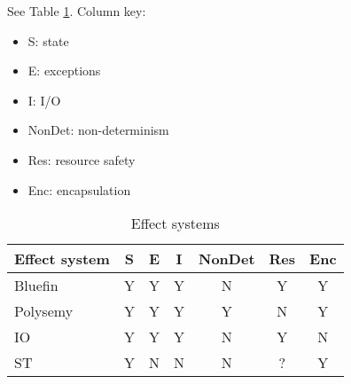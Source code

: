 \documentclass[sigplan,screen]{acmart}
\begin{document}
See Table \ref{tab:comparison}.  Column key:

\begin{itemize}
\item S: state
\item E: exceptions
\item I: I/O
\item NonDet: non-determinism
\item Res: resource safety
\item Enc: encapsulation
\end{itemize}

\begin{table}
  \caption{Effect systems}
  \label{tab:comparison}
  \begin{tabular}{lcccccc}
    \toprule
    Effect system & S & E & I & NonDet & Res & Enc \\
    \midrule
    Bluefin & Y & Y & Y & N & Y & Y\\
    Polysemy & Y & Y & Y & Y & N & Y\\
    IO & Y & Y & Y & N & Y & N\\
    ST & Y & N & N & N & ? & Y\\
  \bottomrule
\end{tabular}
\end{table}
\end{document}
